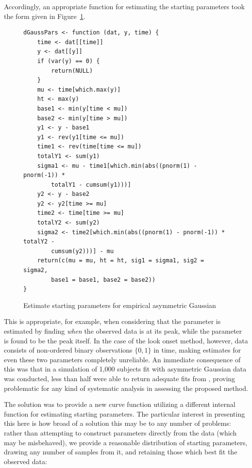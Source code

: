 Accordingly, an appropriate function for estimating the starting parameters took the form given in Figure~\ref{fig:gauss_form}.


\begin{singlespace}
\begin{figure}[H]
\centering
\begin{BVerbatim}
dGaussPars <- function (dat, y, time) {
    time <- dat[[time]]
    y <- dat[[y]]
    if (var(y) == 0) {
        return(NULL)
    }
    mu <- time[which.max(y)]
    ht <- max(y)
    base1 <- min(y[time < mu])
    base2 <- min(y[time > mu])
    y1 <- y - base1
    y1 <- rev(y1[time <= mu])
    time1 <- rev(time[time <= mu])
    totalY1 <- sum(y1)
    sigma1 <- mu - time1[which.min(abs((pnorm(1) - pnorm(-1)) * 
        totalY1 - cumsum(y1)))]
    y2 <- y - base2
    y2 <- y2[time >= mu]
    time2 <- time[time >= mu]
    totalY2 <- sum(y2)
    sigma2 <- time2[which.min(abs((pnorm(1) - pnorm(-1)) * totalY2 - 
        cumsum(y2)))] - mu
    return(c(mu = mu, ht = ht, sig1 = sigma1, sig2 = sigma2, 
        base1 = base1, base2 = base2))
}
\end{BVerbatim}
\caption{Estimate starting parameters for empirical asymmetric Gaussian}
\label{fig:gauss_form}
\end{figure}
\end{singlespace}

This is appropriate, for example, when considering that the  parameter is estimated by finding \textit{when} the observed data is at its peak, while the  parameter is found to be the peak itself. In the case of the look onset method, however, data consists of non-ordered binary observations $\{0,1\}$ in time, making estimates for even these two parameters completely unreliable. An immediate consequence of this was that in a simulation of 1,000 subjects fit with asymmetric Gaussian data was conducted, less than half were able to return adequate fits from , proving problematic for any kind of systematic analysis in assessing the proposed method.

The solution was to provide a new curve function utilizing a different internal function for estimating starting parameters. The particular interest in presenting this here is how broad of a solution this may be to any number of problems: rather than attempting to construct parameters directly from the data (which may be misbehaved), we provide a reasonable distribution of starting parameters, drawing any number of samples from it, and retaining those which best fit the observed data:

